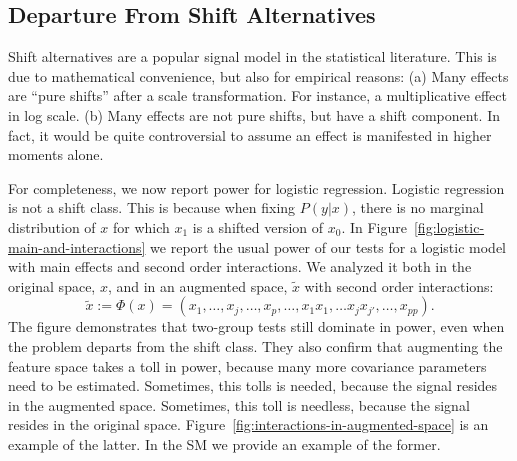\documentclass[]{bio}
\begin{document}
\subsection{Departure From Shift Alternatives}
\label{sec:logistic}
Shift alternatives are a popular signal model in the statistical literature. 
This is due to mathematical convenience, but also for empirical reasons: 
(a) Many effects are ``pure shifts'' after a scale transformation. For instance, a multiplicative effect in log scale.
(b) Many effects are not pure shifts, but have a shift component. 
In fact, it would be quite controversial to assume an effect is manifested in higher moments alone. 

For completeness, we now report power for logistic regression.
Logistic regression is not a shift class. 
This is because when fixing $P(y|x)$, there is no marginal distribution of $x$ for which $x_1 $ is a shifted version of $x_0$.
In Figure~\ref{fig:logistic-main-and-interactions} we report the usual power of our tests for a logistic model with main effects and second order interactions.
We analyzed it both in the original space, $x$, and in an augmented space, $\tilde x$ with second order interactions:
$$\tilde{x}:=\Phi(x)=(x_1,\dots,x_j,\dots,x_p,\dots,x_1x_1,\dots x_jx_{j'},\dots,x_{pp}).$$
The figure demonstrates that two-group tests still dominate in power, even when the problem departs from the shift class.
They also confirm that augmenting the feature space takes a toll in power, because many more covariance parameters need to be estimated. 
Sometimes, this tolls is needed, because the signal resides in the augmented space. 
Sometimes, this toll is needless, because the signal resides in the original space. 
Figure~\ref{fig:interactions-in-augmented-space} is an example of the latter. 
In the SM we provide an example of the former. 
\end{document}
